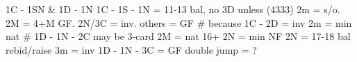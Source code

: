 1C - 1SN & 1D - 1N
1C - 1S - 1N = 11-13 bal, no 3D unless (4333)
    2m = s/o. 2M = 4+M GF. 2N/3C = inv. others = GF  
    # because 1C - 2D = inv
2m = min nat  # 1D - 1N - 2C may be 3-card
2M = nat 16+
    2N = min NF
2N = 17-18 bal
rebid/raise 3m = inv
1D - 1N - 3C = GF
double jump = ?